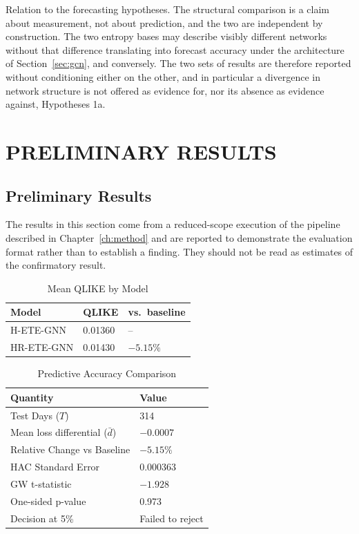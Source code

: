 \documentclass[12pt,oneside]{report}
\begin{document}
Relation to the forecasting hypotheses. The structural comparison is a
claim about measurement, not about prediction, and the two are
independent by construction. The two entropy bases may describe visibly
different networks without that difference translating into forecast
accuracy under the architecture of Section~\ref{sec:gcn}, and
conversely. The two sets of results are therefore reported without
conditioning either on the other, and in particular a divergence in
network structure is not offered as evidence for, nor its absence as
evidence against, Hypotheses 1a.

\chapter{PRELIMINARY RESULTS}\label{ch:results}

\section{Preliminary Results}

The results in this section come from a reduced-scope execution of the
pipeline described in Chapter~\ref{ch:method} and are reported to
demonstrate the evaluation format rather than to establish a finding.
They should not be read as estimates of the confirmatory result.

\begin{table}[htbp]
  \centering
  \singlespacing
  \caption{Mean QLIKE by Model}\label{tab:qlike}
  \begin{tabular}{lll}
    \toprule
    \textbf{Model} & \textbf{QLIKE} & \textbf{vs.\ baseline} \\
    \midrule
    H-ETE-GNN  & 0.01360 & -- \\
    HR-ETE-GNN & 0.01430 & $-5.15\%$ \\
    \bottomrule
  \end{tabular}
\end{table}

\begin{table}[htbp]
  \centering
  \singlespacing
  \caption{Predictive Accuracy Comparison}\label{tab:gw}
  \begin{tabular}{ll}
    \toprule
    \textbf{Quantity} & \textbf{Value} \\
    \midrule
    Test Days ($T$)                        & 314 \\
    Mean loss differential ($\bar{d}$)     & $-0.0007$ \\
    Relative Change vs Baseline            & $-5.15\%$ \\
    HAC Standard Error                     & 0.000363 \\
    GW t-statistic                         & $-1.928$ \\
    One-sided p-value                      & 0.973 \\
    Decision at 5\%                        & Failed to reject \\
    \bottomrule
  \end{tabular}
\end{table}
\end{document}
